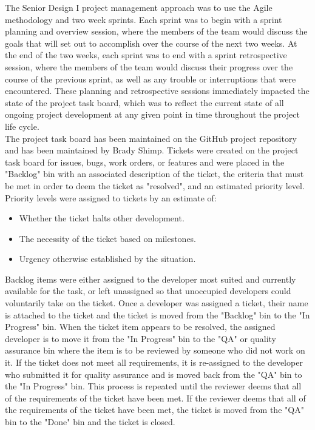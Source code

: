 The Senior Design I project management approach was to use the Agile methodology and two week sprints.  Each sprint was to begin with a sprint planning and overview session, where the members of the team would discuss the goals that will set out to accomplish over the course of the next two weeks.  At the end of the two weeks, each sprint was to end with a sprint retrospective session, where the members of the team would discuss their progress over the course of the previous sprint, as well as any trouble or interruptions that were encountered. These planning and retrospective sessions immediately impacted the state of the project task board, which was to reflect the current state of all ongoing project development at any given point in time throughout the project life cycle.\\

The project task board has been maintained on the GitHub project repository and has been maintained by Brady Shimp.  
Tickets were created on the project task board for issues, bugs, work orders, or features and were placed in the "Backlog" bin with an associated description of the ticket, the criteria that must be met in order to deem the ticket as "resolved", and an estimated priority level. 
Priority levels were assigned to tickets by an estimate of:
\begin{itemize}
    \item Whether the ticket halts other development.
    \item The necessity of the ticket based on milestones. 
    \item Urgency otherwise established by the situation.
\end{itemize}

Backlog items were either assigned to the developer most suited and currently available for the task, or left unassigned so that unoccupied developers could voluntarily take on the ticket.  Once a developer was assigned a ticket, their name is attached to the ticket and the ticket is moved from the "Backlog" bin to the "In Progress" bin.  When the ticket item appears to be resolved, the assigned developer is to move it from the "In Progress" bin to the "QA" or quality assurance bin where the item is to be reviewed by someone who did not work on it.  If the ticket does not meet all requirements, it is re-assigned to the developer who submitted it for quality assurance and is moved back from the "QA" bin to the "In Progress" bin. This process is repeated until the reviewer deems that all of the requirements of the ticket have been met.  If the reviewer deems that all of the requirements of the ticket have been met, the ticket is moved from the "QA" bin to the "Done" bin and the ticket is closed.\\

